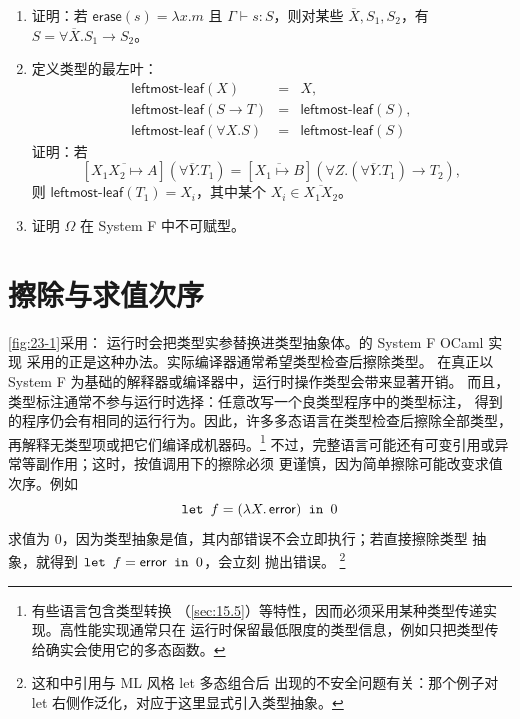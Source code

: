 \begin{exercise}[\(\star\star\star\star\)]
\begin{enumerate}
  \item 证明：若 \(\mathsf{erase}(s)=\lambda x.m\) 且
        \(\Gamma\vdash s:S\)，则对某些 \(\overline X,S_1,S_2\)，有
        \(S=\forall\overline X.S_1\to S_2\)。
  \item 定义类型的最左叶：
        \[
        \begin{array}{rcl}
        \mathsf{leftmost\mbox{-}leaf}(X)&=&X,\\
        \mathsf{leftmost\mbox{-}leaf}(S\to T)&=&
          \mathsf{leftmost\mbox{-}leaf}(S),\\
        \mathsf{leftmost\mbox{-}leaf}(\forall X.S)&=&
          \mathsf{leftmost\mbox{-}leaf}(S)
        \end{array}
        \]
        证明：若
        \[
        [\overline{X_1X_2\mapsto A}](\forall\overline Y.T_1)
        =[\overline{X_1\mapsto B}]
          (\forall Z.(\forall\overline Y.T_1)\to T_2),
        \]
        则 \(\mathsf{leftmost\mbox{-}leaf}(T_1)=X_i\)，其中某个
        \(X_i\in\overline{X_1X_2}\)。
  \item 证明 \(\Omega\) 在 System F 中不可赋型。
\end{enumerate}
\end{exercise}

\section{擦除与求值次序}
\label{sec:23.7}

\cref{fig:23-1}采用：
运行时会把类型实参替换进类型抽象体。的 System F OCaml 实现
采用的正是这种办法。实际编译器通常希望类型检查后擦除类型。
在真正以 System F 为基础的解释器或编译器中，运行时操作类型会带来显著开销。
而且，类型标注通常不参与运行时选择：任意改写一个良类型程序中的类型标注，
得到的程序仍会有相同的运行行为。因此，许多多态语言在类型检查后擦除全部类型，
再解释无类型项或把它们编译成机器码。\footnote{有些语言包含类型转换
（\cref{sec:15.5}）等特性，因而必须采用某种类型传递实现。高性能实现通常只在
运行时保留最低限度的类型信息，例如只把类型传给确实会使用它的多态函数。}
不过，完整语言可能还有可变引用或异常等副作用；这时，按值调用下的擦除必须
更谨慎，因为简单擦除可能改变求值次序。例如
\[
\texttt{let }f=(\lambda X.\,\mathsf{error})\texttt{ in }0
\]
求值为 \(0\)，因为类型抽象是值，其内部错误不会立即执行；若直接擦除类型
抽象，就得到 \(\texttt{let }f=\mathsf{error}\texttt{ in }0\)，会立刻
抛出错误。
\footnote{这和中引用与 ML 风格 let 多态组合后
出现的不安全问题有关：那个例子对 let 右侧作泛化，对应于这里显式引入类型抽象。}

